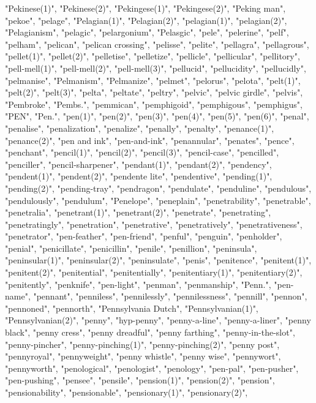 "Pekinese(1)",
"Pekinese(2)",
"Pekingese(1)",
"Pekingese(2)",
"Peking man",
"pekoe",
"pelage",
"Pelagian(1)",
"Pelagian(2)",
"pelagian(1)",
"pelagian(2)",
"Pelagianism",
"pelagic",
"pelargonium",
"Pelasgic",
"pele",
"pelerine",
"pelf",
"pelham",
"pelican",
"pelican crossing",
"pelisse",
"pelite",
"pellagra",
"pellagrous",
"pellet(1)",
"pellet(2)",
"pelletise",
"pelletize",
"pellicle",
"pellicular",
"pellitory",
"pell-mell(1)",
"pell-mell(2)",
"pell-mell(3)",
"pellucid",
"pellucidity",
"pellucidly",
"pelmanise",
"Pelmanism",
"Pelmanize",
"pelmet",
"pelorus",
"pelota",
"pelt(1)",
"pelt(2)",
"pelt(3)",
"pelta",
"peltate",
"peltry",
"pelvic",
"pelvic girdle",
"pelvis",
"Pembroke",
"Pembs.",
"pemmican",
"pemphigoid",
"pemphigous",
"pemphigus",
"PEN",
"Pen.",
"pen(1)",
"pen(2)",
"pen(3)",
"pen(4)",
"pen(5)",
"pen(6)",
"penal",
"penalise",
"penalization",
"penalize",
"penally",
"penalty",
"penance(1)",
"penance(2)",
"pen and ink",
"pen-and-ink",
"penannular",
"penates",
"pence",
"penchant",
"pencil(1)",
"pencil(2)",
"pencil(3)",
"pencil-case",
"pencilled",
"penciller",
"pencil-sharpener",
"pendant(1)",
"pendant(2)",
"pendency",
"pendent(1)",
"pendent(2)",
"pendente lite",
"pendentive",
"pending(1)",
"pending(2)",
"pending-tray",
"pendragon",
"pendulate",
"penduline",
"pendulous",
"pendulously",
"pendulum",
"Penelope",
"peneplain",
"penetrability",
"penetrable",
"penetralia",
"penetrant(1)",
"penetrant(2)",
"penetrate",
"penetrating",
"penetratingly",
"penetration",
"penetrative",
"penetratively",
"penetrativeness",
"penetrator",
"pen-feather",
"pen-friend",
"penful",
"penguin",
"penholder",
"penial",
"penicillate",
"penicillin",
"penile",
"penillion",
"peninsula",
"peninsular(1)",
"peninsular(2)",
"peninsulate",
"penis",
"penitence",
"penitent(1)",
"penitent(2)",
"penitential",
"penitentially",
"penitentiary(1)",
"penitentiary(2)",
"penitently",
"penknife",
"pen-light",
"penman",
"penmanship",
"Penn.",
"pen-name",
"pennant",
"penniless",
"pennilessly",
"pennilessness",
"pennill",
"pennon",
"pennoned",
"pennorth",
"Pennsylvania Dutch",
"Pennsylvanian(1)",
"Pennsylvanian(2)",
"penny",
"hyp-penny",
"penny-a-line",
"penny-a-liner",
"penny black",
"penny cress",
"penny dreadful",
"penny farthing",
"penny-in-the-slot",
"penny-pincher",
"penny-pinching(1)",
"penny-pinching(2)",
"penny post",
"pennyroyal",
"pennyweight",
"penny whistle",
"penny wise",
"pennywort",
"pennyworth",
"penological",
"penologist",
"penology",
"pen-pal",
"pen-pusher",
"pen-pushing",
"pensee",
"pensile",
"pension(1)",
"pension(2)",
"pension",
"pensionability",
"pensionable",
"pensionary(1)",
"pensionary(2)",
